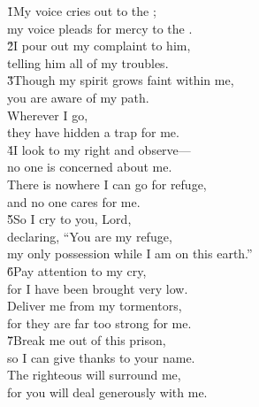 \begin{poetry}
\poeml \v{1}My voice cries out to the ; \\
\poemll    my voice pleads for mercy to the . \\
\poeml \v{2}I pour out my complaint to him, \\
\poemll    telling him all of my troubles. \\
\poeml \v{3}Though my spirit grows faint within me, \\
\poemll    you are aware of my path. \\
\poeml Wherever I go, \\
\poemll    they have hidden a trap for me. \\
\poeml \v{4}I look to my right and observe--- \\
\poemll    no one is concerned about me. \\
\poeml There is nowhere I can go for refuge, \\
\poemll    and no one cares for me. \\
\poeml \v{5}So I cry to you, Lord, \\
\poemll    declaring, ``You are my refuge, \\
\poemlll       my only possession while I am on this earth.'' \\
\poeml \v{6}Pay attention to my cry, \\
\poemll    for I have been brought very low. \\
\poeml Deliver me from my tormentors, \\
\poemll    for they are far too strong for me. \\
\poeml \v{7}Break me out of this prison, \\
\poemll    so I can give thanks to your name. \\
\poeml The righteous will surround me, \\
\poemll    for you will deal generously with me.
\end{poetry}

